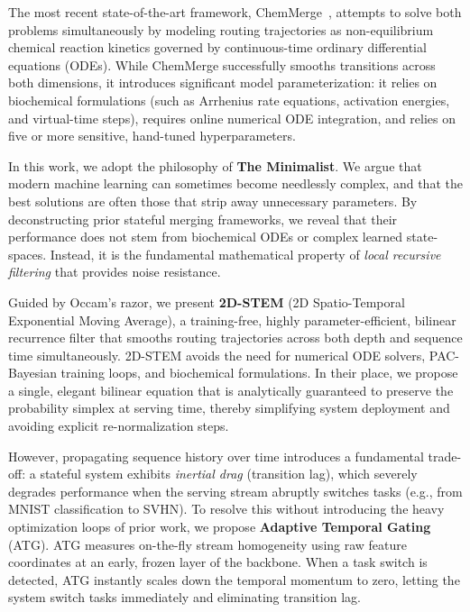The most recent state-of-the-art framework, ChemMerge~\cite{chemmerge}, attempts to solve both problems simultaneously by modeling routing trajectories as non-equilibrium chemical reaction kinetics governed by continuous-time ordinary differential equations (ODEs). While ChemMerge successfully smooths transitions across both dimensions, it introduces significant model parameterization: it relies on biochemical formulations (such as Arrhenius rate equations, activation energies, and virtual-time steps), requires online numerical ODE integration, and relies on five or more sensitive, hand-tuned hyperparameters.

In this work, we adopt the philosophy of \textbf{The Minimalist}. We argue that modern machine learning can sometimes become needlessly complex, and that the best solutions are often those that strip away unnecessary parameters. By deconstructing prior stateful merging frameworks, we reveal that their performance does not stem from biochemical ODEs or complex learned state-spaces. Instead, it is the fundamental mathematical property of \emph{local recursive filtering} that provides noise resistance.

Guided by Occam's razor, we present \textbf{2D-STEM} (2D Spatio-Temporal Exponential Moving Average), a training-free, highly parameter-efficient, bilinear recurrence filter that smooths routing trajectories across both depth and sequence time simultaneously. 2D-STEM avoids the need for numerical ODE solvers, PAC-Bayesian training loops, and biochemical formulations. In their place, we propose a single, elegant bilinear equation that is analytically guaranteed to preserve the probability simplex at serving time, thereby simplifying system deployment and avoiding explicit re-normalization steps. 

However, propagating sequence history over time introduces a fundamental trade-off: a stateful system exhibits \emph{inertial drag} (transition lag), which severely degrades performance when the serving stream abruptly switches tasks (e.g., from MNIST classification to SVHN). To resolve this without introducing the heavy optimization loops of prior work, we propose \textbf{Adaptive Temporal Gating} (ATG). ATG measures on-the-fly stream homogeneity using raw feature coordinates at an early, frozen layer of the backbone. When a task switch is detected, ATG instantly scales down the temporal momentum to zero, letting the system switch tasks immediately and eliminating transition lag.

